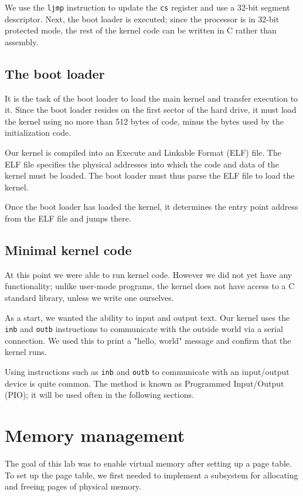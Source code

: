\documentclass{report}
\begin{document}
We use the \texttt{ljmp} instruction to update the \texttt{cs} register and use a
32-bit segment descriptor. Next, the boot loader is executed; since the
processor is in 32-bit protected mode, the rest of the kernel code can be
written in C rather than assembly.




\section{The boot loader}
It is the task of the boot loader to load the main kernel and transfer
execution to it. Since the boot loader resides on the first sector of the hard
drive, it must load the kernel using no more than 512 bytes of code, minus the
bytes used by the initialization code.

Our kernel is compiled into an Execute and Linkable Format (ELF) file. The ELF
file specifies the physical addresses into which the code and data of the
kernel must be loaded. The boot loader must thus parse the ELF file to load
the kernel.

Once the boot loader has loaded the kernel, it determines the entry point
address from the ELF file and jumps there.


\section{Minimal kernel code}
At this point we were able to run kernel code. However we did not yet have any
functionality; unlike user-mode programs, the kernel does not have access to a
C standard library, unless we write one ourselves.

As a start, we wanted the ability to input and output text.
Our kernel uses the \texttt{inb} and \texttt{outb} instructions to
communicate with the outside world via a serial connection. We used this to
print a "hello, world" message and confirm that the kernel runs.

Using instructions such as \texttt{inb} and \texttt{outb} to communicate with
an input/output device is quite common. The method is known as Programmed
Input/Output (PIO); it will be used often in the following sections.



\chapter{Memory management}
\label{sec:mem}
The goal of this lab was to enable virtual memory after setting up a page
table. To set up the page table, we first needed to implement a subsystem
for allocating and freeing pages of physical memory.
\end{document}
